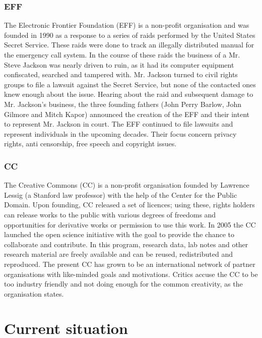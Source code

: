 \documentclass[a4paper]{report}
\begin{document}
\subsection{EFF}
\label{sec:EFF}
The Electronic Frontier Foundation (EFF) is a non-profit organisation and was founded in 1990 as a response to a series of raids performed by the United States Secret Service. These raids were done to track an illegally distributed manual for the emergency call system. In the course of these raids the business of a Mr. Steve Jackson was nearly driven to ruin, as it had its computer equipment confiscated, searched and tampered with. Mr. Jackson turned to civil rights groups to file a lawsuit against the Secret Service, but none of the contacted ones knew enough about the issue. Hearing about the raid and subsequent damage to Mr. Jackson's business, the three founding fathers (John Perry Barlow, John Gilmore and Mitch Kapor) announced the creation of the EFF and their intent to represent Mr. Jackson in court.
The EFF continued to file lawsuits and represent individuals in the upcoming decades. Their focus concern privacy rights, anti censorship, free speech and copyright issues. \parencite{EFFhistory} \parencite{Schultz}

\subsection{CC}
\label{sec:CC}
The Creative Commons (CC) is a non-profit organisation founded by Lawrence Lessig (a Stanford law professor) with the help of the Center for the Public Domain. Upon founding, CC released a set of licences; using these, rights holders can release works to the public with various degrees of freedoms and opportunities for derivative works or permission to use this work.
In 2005 the CC launched the open science initiative with the goal to provide the chance to collaborate and contribute. In this program, research data, lab notes and other research material are freely available and can be reused, redistributed and reproduced.
The present CC has grown to be an international network of partner organisations with like-minded goals and motivations. \parencite{Plotkin2002} \parencite{CC2016}
Critics accuse the CC to be too industry friendly and not doing enough for the common creativity, as the organisation states. \parencite{Berry2005}

\chapter{Current situation}
\label{ch:CurrSit}
\end{document}
